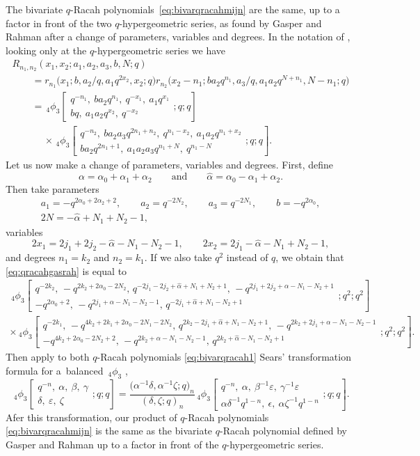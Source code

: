 \documentclass[10pt,a4paper]{amsart}
\numberwithin{equation}{section}
\newcommand{\qhyp}[5]{\,_{#1}\phi_{#2} \left[ \begin{matrix}
		#3 \\ #4 \end{matrix};#5 \right]}
\begin{document}
\begin{Remark}
	The bivariate $q$-Racah polynomials~\eqref{eq:bivarqracahmijn} are the same, up to a factor in front of the two $q$-hypergeometric series, as found by Gasper and Rahman \cite{Gasper2007} after a change of parameters, variables and degrees. In the notation of \cite[equation~(2.6)]{Gasper2007}, looking only at the $q$-hypergeometric series we have
	\begin{gather}
R_{n_1,n_2}(x_1,x_2;a_1,a_2,a_3,b,N;q)\nonumber\\
\qquad{} =r_{n_1}\big(x_1;b,a_2/q,a_1q^{2x_2},x_2;q\big)r_{n_2}\big(x_2-n_1;ba_2q^{n_1},a_3/q,a_1a_2q^{N+n_1},N-n_1;q\big)\nonumber\\
\qquad{} = \qhyp{4}{3}{q^{-n_1},\ ba_2q^{n_1},\ q^{-x_1},\ a_1q^{x_1}}{bq,\ a_1a_2q^{x_2},\ q^{-x_2}}{q;q}\nonumber\\
\qquad\quad \ {}\times \qhyp{4}{3}{q^{-n_2},\ ba_2a_3q^{2n_1+n_2},\ q^{n_1-x_2},\ a_1a_2q^{n_1+x_2}}{ba_2q^{2n_1+1},\ a_1a_2a_3q^{n_1+N},\ q^{n_1-N}}{q;q}.\label{eq:qracahgasrah}
	\end{gather}
Let us now make a change of parameters, variables and degrees. First, define
\[
	\alpha=\alpha_0+\alpha_1+\alpha_2\qquad \text{and}\qquad \hat{\alpha}=\alpha_0-\alpha_1+\alpha_2.
	\]
Then take parameters
	\begin{gather*}
	a_1=-q^{2\alpha_0+2\alpha_2+2},\qquad a_2=q^{-2N_2},\qquad a_3=q^{-2N_1},\qquad b=-q^{2\alpha_0},\\ 2N=-\hat{\alpha}+N_1+N_2-1,
	\end{gather*}
	variables
	\[
	2x_1=2j_1+2j_2-\hat{\alpha}-N_1-N_2-1,\qquad 2x_2=2j_1-\hat{\alpha}-N_1+N_2-1,
	\]
	and degrees $n_1=k_2$ and $n_2=k_1$. If we also take $q^2$ instead of $q$, we obtain that \eqref{eq:qracahgasrah} is equal to
	\begin{gather}
		\qhyp{4}{3}{q^{-2k_2},\, -q^{2k_2+2\alpha_0-2N_2},\, q^{-2j_1-2j_2+\hat{\alpha}+N_1+N_2+1},\, -q^{2j_1+2j_2+\alpha-N_1-N_2+1}}{-q^{2\alpha_0+2},\, -q^{2j_1+\alpha-N_1-N_2-1},\, q^{-2j_1+\hat{\alpha}+N_1-N_2+1}}{q^2;q^2}\label{eq:bivarqracah1}\\
		\times\qhyp{4}{3}{q^{-2k_1},\, -q^{4k_2+2k_1+2\alpha_0-2N_1-2N_2},\, q^{2k_2-2j_1+\hat{\alpha}+N_1-N_2+1},\, -q^{2k_2+2j_1+\alpha-N_1-N_2-1}}{-q^{4k_2+2\alpha_0-2N_2+2},\, -q^{2k_2+\alpha-N_1-N_2-1},\, q^{2k_2+\hat{\alpha}-N_1-N_2+1}}{q^2;q^2}\!.\nonumber%
	\end{gather}
	Then apply to both $q$-Racah polynomials \eqref{eq:bivarqracah1} %
Sears' transformation formula for a~balanced~${}_{4}\phi_{3}$ \cite[equation~(III.15)]{GR2004},
	\[\qhyp{4}{3}{q^{-n},\ \alpha,\ \beta,\ \gamma}{\delta,\ \varepsilon,\ \zeta}{q;q}=\frac{\big(\alpha^{-1}\delta,\alpha^{-1}\zeta;q\big)_n}{(\delta,\zeta;q)_n}\qhyp{4}{3}{q^{-n},\ \alpha,\ \beta^{-1}\varepsilon,\ \gamma^{-1}\varepsilon}{\alpha\delta^{-1}q^{1-n},\ \epsilon,\ \alpha\zeta^{-1}q^{1-n}}{q;q}.\]
	Afer this transformation, our product of $q$-Racah polynomials \eqref{eq:bivarqracahmijn} is the same as the bivariate $q$-Racah polynomial defined by Gasper and Rahman \cite{Gasper2007} up to a factor in front of the $q$-hypergeometric series.
\end{Remark}
\end{document}
